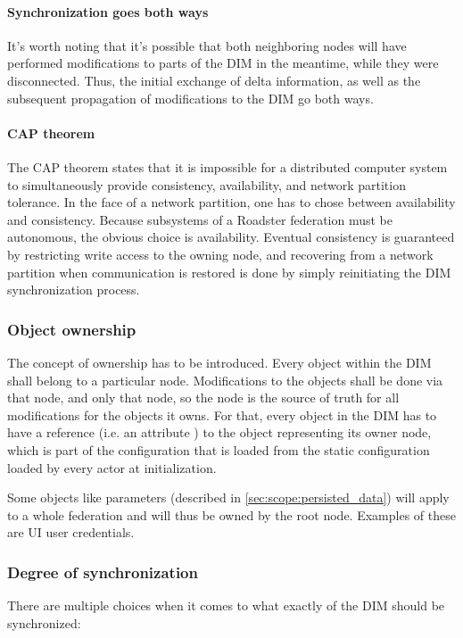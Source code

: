 \paragraph{Synchronization goes both ways}
It's worth noting that it's possible that both neighboring nodes will have performed
modifications to parts of the DIM in the meantime, while they were
disconnected. Thus, the initial exchange of delta information, as well as the
subsequent propagation of modifications to the DIM go both ways.

\paragraph{CAP theorem}
The CAP theorem \cite{wp:cap} states that it is impossible for a distributed
computer system to simultaneously provide consistency, availability, and
network partition tolerance. In the face of a network partition, one has to
chose between availability and consistency. Because subsystems of a Roadster
federation must be autonomous, the obvious choice is availability. Eventual
consistency is guaranteed by restricting write access to the owning node, and
recovering from a network partition when communication is restored is done by
simply reinitiating the DIM synchronization process.

\subsubsection{Object ownership}
The concept of ownership has to be introduced. Every object within the DIM
shall belong to a particular node. Modifications to the objects shall be done via
that node, and only that node, so the node is the source of truth for all modifications for the
objects it owns. For that, every object in the DIM has to have a reference
(i.e. an attribute ) to the object representing its owner node, which is part of
the configuration that is loaded from the static configuration loaded by every
actor at initialization.

Some objects like parameters (described in \autoref{sec:scope:persisted_data})
will apply to a whole federation and will thus be owned by the root node.
Examples of these are UI user credentials.

\subsubsection{Degree of synchronization}
There are multiple choices when it comes to what exactly of the DIM should be synchronized:

